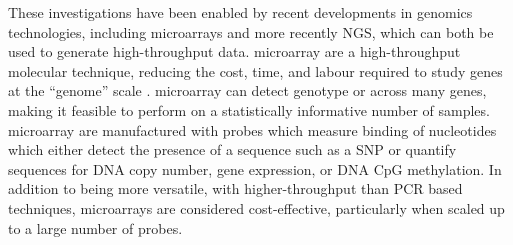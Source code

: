 These investigations have been enabled by recent developments in \glspl{genomic} technologies, including \glspl{microarray} and more recently \gls{NGS}, which can both be used to generate high-throughput  data. \Gls{microarray} are a high-throughput molecular technique, reducing the cost, time, and labour required to study genes at the ``genome'' scale \citep{Schena1996}. \Gls{microarray} can detect genotype or  across many genes, making it feasible to perform on a statistically informative number of samples. \Gls{microarray} are manufactured with probes which measure binding of nucleotides which either detect the presence of a sequence such as a \gls{SNP} or quantify sequences for \acrshort{DNA} copy number, \gls{gene expression}, or \acrshort{DNA} CpG methylation. %
In addition to being more versatile, with higher-throughput than \gls{PCR} based techniques, \glspl{microarray} are considered cost-effective, particularly when scaled up to a large number of probes.


